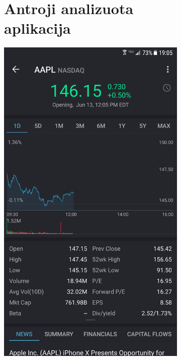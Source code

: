 \documentclass[a4paper,12pt,fleqn]{article}
\begin{document}
\begin{appendices}
\begin{figure}[t!]
	\begin{subfigure}{0.5\textwidth}
		\centering
		\tocless\section{Antroji analizuota aplikacija}
		\includegraphics[scale=0.4]{priedas4.png}
		\label{app:priedas4}
	\end{subfigure}
\end{figure}


\end{appendices}
\end{document}

